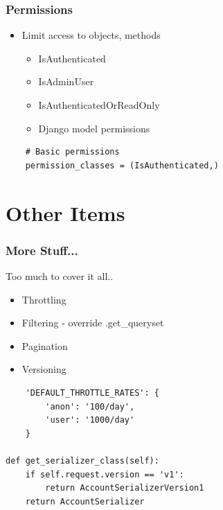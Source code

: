 \documentclass{beamer}
\begin{document}
\begin{frame}[fragile]

  \frametitle{Permissions}

  \begin{itemize}
      \item Limit access to objects, methods
            \begin{itemize}
                \item IsAuthenticated
                \item IsAdminUser
                \item IsAuthenticatedOrReadOnly
                \item Django model permissions
            \end{itemize}
  \end{itemize}

    \begin{lstlisting}  
    # Basic permissions
    permission_classes = (IsAuthenticated,)
    \end{lstlisting}
  
\end{frame}

\section{Other Items}
\begin{frame}[fragile]

  \frametitle{More Stuff...}
  
  Too much to cover it all..

  \begin{itemize}
      \item Throttling
      \item Filtering - override .get\_queryset\(\)
      \item Pagination
      \item Versioning
  \end{itemize}
  
    \begin{lstlisting}  
    'DEFAULT_THROTTLE_RATES': {
        'anon': '100/day',
        'user': '1000/day'
    }

def get_serializer_class(self):
    if self.request.version == 'v1':
        return AccountSerializerVersion1
    return AccountSerializer
    \end{lstlisting}

\end{frame}
\end{document}
